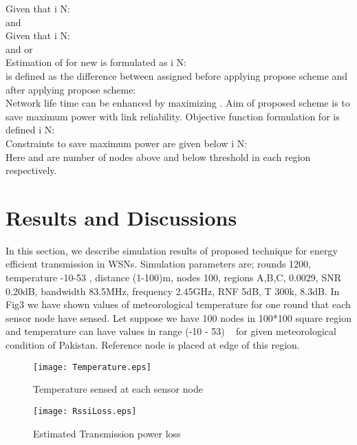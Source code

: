 \documentclass[12pt, conference, compsocconf, onecolumn, draftcls]{IEEEtran}
\begin{document}
Given that  i  N:\\
   and   \\

Given that  i  N:\\
   and    or   \\
Estimation of  for new  is formulated as  i  N:\\

 is defined as the difference between  assigned before applying propose scheme and after applying propose scheme:\\

Network life time can be enhanced by maximizing . Aim of proposed scheme is to save maximum power with link reliability. Objective  function formulation for  is defined  i  N:\\

Constraints to save maximum power are given below  i  N:\\



Here  and  are number of nodes above and below threshold in each region respectively.

\section{Results and Discussions}

In this section, we describe simulation results of proposed technique for energy efficient transmission in WSNs. Simulation parameters are; rounds 1200, temperature -10-53 , distance (1-100)m, nodes 100, regions A,B,C,  0.0029, SNR 0.20dB, bandwidth 83.5MHz, frequency 2.45GHz, RNF 5dB, T 300k,   8.3dB.  In Fig3 we have shown values of meteorological temperature for one round that each sensor node have sensed. Let suppose we have 100 nodes in 100*100  square region and temperature can have values in range (-10 - 53)  ~\cite{13} for given meteorological condition of Pakistan. Reference node is placed at edge of this region.

\begin{figure}[h]
\begin{center}
\texttt{[image: Temperature.eps]}
\caption{Temperature sensed at each sensor node}
\end{center}
\end{figure}
\begin{figure}[h]
\begin{center}
\texttt{[image: RssiLoss.eps]}
\caption{Estimated Transmission power loss}
\end{center}
\end{figure}
\end{document}
